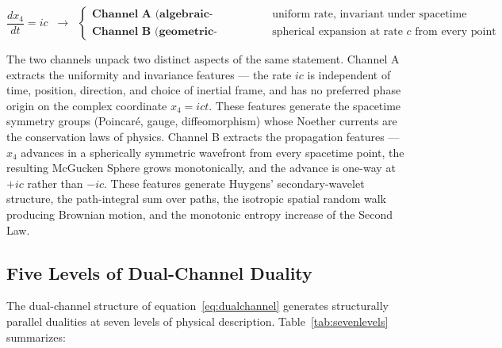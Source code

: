 \documentclass[11pt,a4paper]{article}
\begin{document}
\begin{equation}
\frac{dx_4}{dt} = ic \;\;\longrightarrow\;\; \begin{cases} \textbf{Channel A (algebraic-symmetry):} & \text{uniform rate, invariant under spacetime isometries} \\ \textbf{Channel B (geometric-propagation):} & \text{spherical expansion at rate } c \text{ from every point} \end{cases}
\label{eq:dualchannel}
\end{equation}

The two channels unpack two distinct aspects of the same statement. Channel A extracts the uniformity and invariance features --- the rate $ic$ is independent of time, position, direction, and choice of inertial frame, and has no preferred phase origin on the complex coordinate $x_4 = ict$. These features generate the spacetime symmetry groups (Poincar\'e, gauge, diffeomorphism) whose Noether currents are the conservation laws of physics. Channel B extracts the propagation features --- $x_4$ advances in a spherically symmetric wavefront from every spacetime point, the resulting McGucken Sphere grows monotonically, and the advance is one-way at $+ic$ rather than $-ic$. These features generate Huygens' secondary-wavelet structure, the path-integral sum over paths, the isotropic spatial random walk producing Brownian motion, and the monotonic entropy increase of the Second Law.

\subsection{Five Levels of Dual-Channel Duality}

The dual-channel structure of equation~\eqref{eq:dualchannel} generates structurally parallel dualities at seven levels of physical description. Table~\ref{tab:sevenlevels} summarizes:
\end{document}
